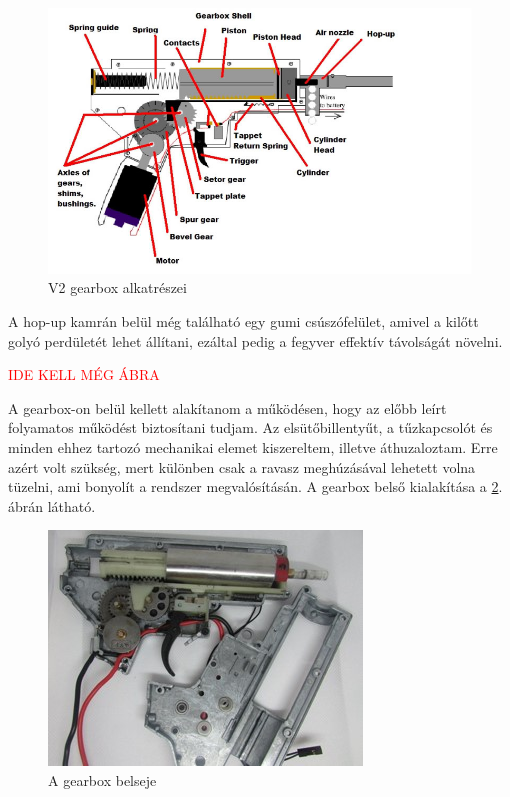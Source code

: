 \documentclass[12pt,a4paper]{article}
\newcommand{\ABRAKELL}{\textcolor{red}{IDE KELL MÉG ÁBRA}}
\begin{document}
\begin{figure}[h!]
	\centering
	\includegraphics[width=1\linewidth]{mech_gearboxdiagram}
	\caption{V2 gearbox alkatrészei}
	\label{fig:mech_gearboxdiagram}
\end{figure}

A hop-up kamrán belül még található egy gumi csúszófelület, amivel a kilőtt golyó perdületét lehet állítani, ezáltal pedig a fegyver effektív távolságát növelni.

\ABRAKELL

A gearbox-on belül kellett alakítanom a működésen, hogy az előbb leírt folyamatos működést biztosítani tudjam.  Az elsütőbillentyűt, a tűzkapcsolót és minden ehhez tartozó mechanikai elemet kiszereltem, illetve áthuzaloztam. Erre azért volt szükség, mert különben csak a ravasz meghúzásával lehetett volna tüzelni, ami bonyolít a rendszer megvalósításán. A gearbox belső kialakítása a \ref{fig:gearboxbele}. ábrán látható.

\begin{figure}[h!]
	\centering
	\includegraphics[width=0.6\linewidth]{gearboxbele}
	\caption{A gearbox belseje}
	\label{fig:gearboxbele}
\end{figure}
\end{document}

